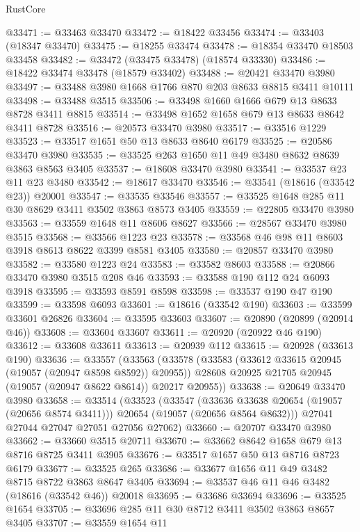 \begin{lexlean}{RustCore}
\begin{coremodule}
@33471 := @33463 @33470
@33472 := @18422 @33456
@33474 := @33403 (@18347 @33470)
@33475 := @18255 @33474
@33478 := @18354 @33470 @18503 @33458
@33482 := @33472 (@33475 @33478) (@18574 @33330)
@33486 := @18422 @33474 @33478 (@18579 @33402)
@33488 := @20421 @33470 @3980
@33497 := @33488 @3980 @1668 @1766 @870 @203 @8633 @8815 @3411 @10111
@33498 := @33488 @3515
@33506 := @33498 @1660 @1666 @679 @13 @8633 @8728 @3411 @8815
@33514 := @33498 @1652 @1658 @679 @13 @8633 @8642 @3411 @8728
@33516 := @20573 @33470 @3980
@33517 := @33516 @1229
@33523 := @33517 @1651 @50 @13 @8633 @8640 @6179
@33525 := @20586 @33470 @3980
@33535 := @33525 @263 @1650 @11 @49 @3480 @8632 @8639 @3863 @8563 @3405
@33537 := @18608 @33470 @3980
@33541 := @33537 @23 @11 @23 @3480
@33542 := @18617 @33470
@33546 := @33541 (@18616 (@33542 @23)) @20001
@33547 := @33535 @33546
@33557 := @33525 @1648 @285 @11 @30 @8629 @3411 @3502 @3863 @8573 @3405
@33559 := @22805 @33470 @3980
@33563 := @33559 @1648 @11 @8606 @8627
@33566 := @28567 @33470 @3980 @3515
@33568 := @33566 @1223 @23
@33578 := @33568 @46 @98 @11 @8603 @3918 @8613 @8622 @3399 @8581 @3405
@33580 := @20857 @33470 @3980
@33582 := @33580 @1223 @24
@33583 := @33582 @8603
@33588 := @20866 @33470 @3980 @3515 @208 @46
@33593 := @33588 @190 @112 @24 @6093 @3918
@33595 := @33593 @8591 @8598
@33598 := @33537 @190 @47 @190
@33599 := @33598 @6093
@33601 := @18616 (@33542 @190)
@33603 := @33599 @33601 @26826
@33604 := @33595 @33603
@33607 := @20890 (@20899 (@20914 @46))
@33608 := @33604 @33607
@33611 := @20920 (@20922 @46 @190)
@33612 := @33608 @33611
@33613 := @20939 @112
@33615 := @20928 (@33613 @190)
@33636 := @33557
    (@33563
      (@33578
        (@33583 (@33612 @33615 @20945 (@19057 (@20947 @8598 @8592)) @20955))
        @28608
        @20925
        @21705
        @20945
        (@19057 (@20947 @8622 @8614))
        @20217
        @20955))
@33638 := @20649 @33470 @3980
@33658 := @33514
    (@33523
      (@33547
        (@33636 @33638 @20654 (@19057 (@20656 @8574 @3411)))
        @20654
        (@19057 (@20656 @8564 @8632)))
      @27041
      @27044
      @27047
      @27051
      @27056
      @27062)
@33660 := @20707 @33470 @3980
@33662 := @33660 @3515 @20711
@33670 := @33662 @8642 @1658 @679 @13 @8716 @8725 @3411 @3905
@33676 := @33517 @1657 @50 @13 @8716 @8723 @6179
@33677 := @33525 @265
@33686 := @33677 @1656 @11 @49 @3482 @8715 @8722 @3863 @8647 @3405
@33694 := @33537 @46 @11 @46 @3482 (@18616 (@33542 @46)) @20018
@33695 := @33686 @33694
@33696 := @33525 @1654
@33705 := @33696 @285 @11 @30 @8712 @3411 @3502 @3863 @8657 @3405
@33707 := @33559 @1654 @11

\end{coremodule}
\end{lexlean}
